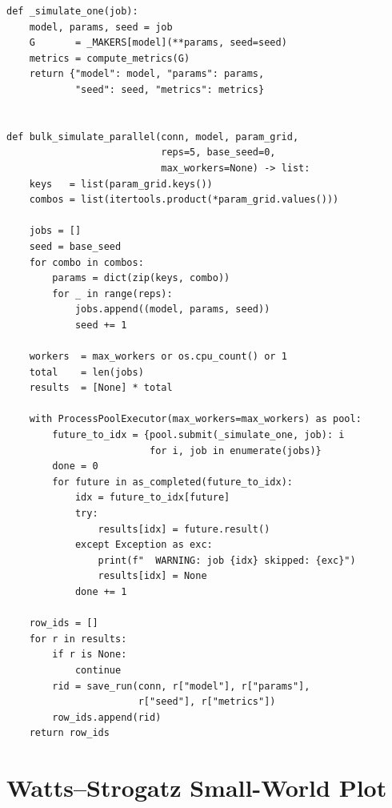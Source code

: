 \documentclass[12pt, a4paper]{report}
\theoremstyle{definition}
\theoremstyle{plain}
\theoremstyle{remark}
\begin{document}
\begin{lstlisting}[style=python,
    caption={Parallel bulk simulation. Graph generation and metric
      computation are distributed across CPU cores via
      \texttt{ProcessPoolExecutor}; database writes are kept serial
      to avoid SQLite file-locking errors. Each job receives an
      independent seed so that results are exactly reproducible.},
    label={lst:sweep}]
def _simulate_one(job):
    model, params, seed = job
    G       = _MAKERS[model](**params, seed=seed)
    metrics = compute_metrics(G)
    return {"model": model, "params": params,
            "seed": seed, "metrics": metrics}


def bulk_simulate_parallel(conn, model, param_grid,
                           reps=5, base_seed=0,
                           max_workers=None) -> list:
    keys   = list(param_grid.keys())
    combos = list(itertools.product(*param_grid.values()))

    jobs = []
    seed = base_seed
    for combo in combos:
        params = dict(zip(keys, combo))
        for _ in range(reps):
            jobs.append((model, params, seed))
            seed += 1

    workers  = max_workers or os.cpu_count() or 1
    total    = len(jobs)
    results  = [None] * total

    with ProcessPoolExecutor(max_workers=max_workers) as pool:
        future_to_idx = {pool.submit(_simulate_one, job): i
                         for i, job in enumerate(jobs)}
        done = 0
        for future in as_completed(future_to_idx):
            idx = future_to_idx[future]
            try:
                results[idx] = future.result()
            except Exception as exc:
                print(f"  WARNING: job {idx} skipped: {exc}")
                results[idx] = None
            done += 1

    row_ids = []
    for r in results:
        if r is None:
            continue
        rid = save_run(conn, r["model"], r["params"],
                       r["seed"], r["metrics"])
        row_ids.append(rid)
    return row_ids
\end{lstlisting}

\section{Watts--Strogatz Small-World Plot}
\label{app:ws_plot}
\end{document}
